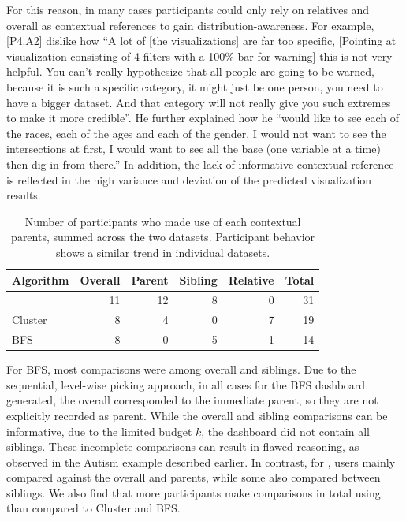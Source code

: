 For this reason, in many cases participants could only rely on relatives and overall as contextual references to gain distribution-awareness. For example, [P4.A2] dislike how ``A lot of [the visualizations] are far too specific, [Pointing at visualization consisting of 4 filters with a 100\% bar for warning] this is not very helpful. You can't really hypothesize that all people are going to be warned, because it is such a specific category, it might just be one person, you need to have a bigger dataset. And that category will not really give you such extremes to make it more credible''. He further explained how he ``would like to see each of the races, each of the ages and each of the gender. I would not want to see the intersections at first, I would want to see all the base (one variable at a time) then dig in from there.'' In addition, the lack of informative contextual reference is reflected in the high variance and deviation of the predicted visualization results.
\begin{table}[h!]
\centering
	\begin{tabular}{l|rrrr|r}
	\hline
	 Algorithm   &   Overall &   Parent &   Sibling &   Relative &   Total \\
	\hline
	 \system     &        11 &       12 &         8 &          0 &      31 \\
	 Cluster     &         8 &        4 &         0 &          7 &      19 \\
	 BFS         &         8 &        0 &         5 &          1 &      14 \\
	\hline
	\end{tabular}
\label{table:contextual_reference_count}
\caption{Number of participants who made use of each contextual parents, summed across the two datasets. Participant behavior shows a similar trend in individual datasets.}
\end{table}
\par For BFS, most comparisons were among overall and siblings. Due to the sequential, level-wise picking approach, in all cases for the BFS dashboard generated, the overall corresponded to the immediate parent, so they are not explicitly recorded as parent. While the overall and sibling comparisons can be informative, due to the limited budget $k$, the dashboard did not contain all siblings. These incomplete comparisons can result in flawed reasoning, as observed in the Autism example described earlier. In contrast, for \system, users mainly compared against the overall and parents, while some also compared between siblings. We also find that more participants make comparisons in total using \system than compared to Cluster and BFS.

